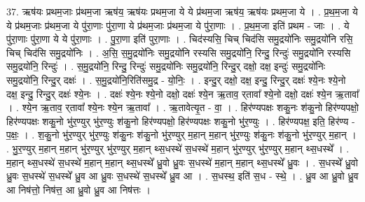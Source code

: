 \documentclass[17pt]{extarticle}
\begin{document}
37. ऋष॑यः प्रथम॒जाः प्र॑थम॒जा ऋष॑य॒ ऋष॑यः प्रथम॒जा ये ये प्र॑थम॒जा ऋष॑य॒ ऋष॑यः प्रथम॒जा ये । . प्र॒थ॒म॒जा ये ये प्र॑थम॒जाः प्र॑थम॒जा ये पु॑रा॒णाः पु॑रा॒णा ये प्र॑थम॒जाः प्र॑थम॒जा ये पु॑रा॒णाः । . प्र॒थ॒म॒जा इति॑ प्रथम - जाः । . ये पु॑रा॒णाः पु॑रा॒णा ये ये पु॑रा॒णाः । . पु॒रा॒णा इति॑ पुरा॒णाः । . चिद॑स्यसि॒ चिच् चिद॑सि समु॒द्रयो॑निः समु॒द्रयो॑नि रसि॒ चिच् चिद॑सि समु॒द्रयो॑निः । . अ॒सि॒ स॒मु॒द्रयो॑निः समु॒द्रयो॑नि रस्यसि समु॒द्रयो॑नि॒ रिन्दु॒ रिन्दुः॑ समु॒द्रयो॑नि रस्यसि समु॒द्रयो॑नि॒ रिन्दुः॑ । . स॒मु॒द्रयो॑नि॒ रिन्दु॒ रिन्दुः॑ समु॒द्रयो॑निः समु॒द्रयो॑नि॒ रिन्दु॒र् दक्षो॒ दक्ष॒ इन्दुः॑ समु॒द्रयो॑निः समु॒द्रयो॑नि॒ रिन्दु॒र् दक्षः॑ । . स॒मु॒द्रयो॑नि॒रिति॑समु॒द्र - यो॒निः॒ । . इन्दु॒र् दक्षो॒ दक्ष॒ इन्दु॒ रिन्दु॒र् दक्षः॑ श्ये॒नः श्ये॒नो दक्ष॒ इन्दु॒ रिन्दु॒र् दक्षः॑ श्ये॒नः । . दक्षः॑ श्ये॒नः श्ये॒नो दक्षो॒ दक्षः॑ श्ये॒न ऋ॒ताव॒ र्‌तावा᳚ श्ये॒नो दक्षो॒ दक्षः॑ श्ये॒न ऋ॒तावा᳚ । . श्ये॒न ऋ॒ताव॒ र्‌तावा᳚ श्ये॒नः श्ये॒न ऋ॒तावा᳚ । . ऋ॒तावेत्यृ॒त - वा॒ । . हिर॑ण्यपक्षः शकु॒नः श॑कु॒नो हिर॑ण्यपक्षो॒ हिर॑ण्यपक्षः शकु॒नो भु॑र॒ण्युर् भु॑र॒ण्युः श॑कु॒नो हिर॑ण्यपक्षो॒ हिर॑ण्यपक्षः शकु॒नो भु॑र॒ण्युः । . हिर॑ण्यपक्ष॒ इति॒ हिर॑ण्य - प॒क्षः॒ । . श॒कु॒नो भु॑र॒ण्युर् भु॑र॒ण्युः श॑कु॒नः श॑कु॒नो भु॑र॒ण्युर् म॒हान् म॒हान् भु॑र॒ण्युः श॑कु॒नः श॑कु॒नो भु॑र॒ण्युर् म॒हान् । . भु॒र॒ण्युर् म॒हान् म॒हान् भु॑र॒ण्युर् भु॑र॒ण्युर् म॒हान् थ्स॒धस्थे॑ स॒धस्थे॑ म॒हान् भु॑र॒ण्युर् भु॑र॒ण्युर् म॒हान् थ्स॒धस्थे᳚ । . म॒हान् थ्स॒धस्थे॑ स॒धस्थे॑ म॒हान् म॒हान् थ्स॒धस्थे᳚ ध्रु॒वो ध्रु॒वः स॒धस्थे॑ म॒हान् म॒हान् थ्स॒धस्थे᳚ ध्रु॒वः । . स॒धस्थे᳚ ध्रु॒वो ध्रु॒वः स॒धस्थे॑ स॒धस्थे᳚ ध्रु॒व आ ध्रु॒वः स॒धस्थे॑ स॒धस्थे᳚ ध्रु॒व आ । . स॒धस्थ॒ इति॑ स॒ध - स्थे॒ । . ध्रु॒व आ ध्रु॒वो ध्रु॒व आ निष॑त्तो॒ निष॑त्त॒ आ ध्रु॒वो ध्रु॒व आ निष॑त्तः । \newline
\pagebreak
{}
\end{document}
